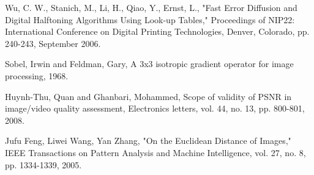 \documentclass[12pt]{amsart}
\theoremstyle{definition}
\theoremstyle{remark}
\numberwithin{thm}{section}
\begin{document}




\begin{thebibliography}{widest entry}
Wu, C. W., Stanich, M., Li, H., Qiao, Y., Ernst, L., "Fast Error Diffusion and Digital Halftoning Algorithms Using Look-up Tables," Proceedings of NIP22: International Conference on Digital Printing Technologies, Denver, Colorado, pp. 240-243, September 2006.


Sobel, Irwin and Feldman, Gary,
{A 3x3 isotropic gradient operator for image processing}, 1968.

Huynh-Thu, Quan and Ghanbari, Mohammed,
Scope of validity of PSNR in image/video quality assessment,
Electronics letters, vol. 44, no. 13, pp. 800-801, 2008.

Jufu Feng, Liwei Wang, Yan Zhang, "On the Euclidean Distance of Images," IEEE Transactions on Pattern Analysis and Machine Intelligence, vol. 27, no. 8, pp. 1334-1339, 2005.
\end{thebibliography}
 
\end{document}
